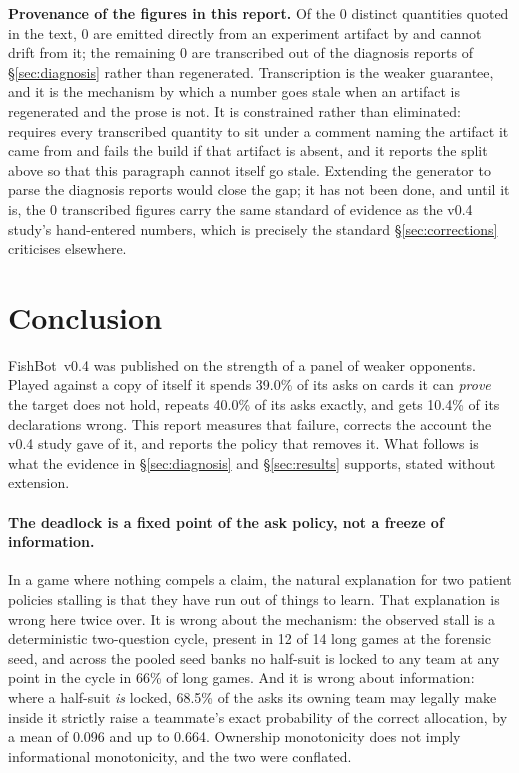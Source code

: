 \documentclass[11pt]{article}
\theoremstyle{definition}
\DeclareRobustCommand{\vfour}{\texorpdfstring{\mbox{FishBot v0.4}}{FishBot v0.4}}
\providecommand{\numDeadAsk}{39.0}
\providecommand{\numRepeatAsk}{40.0}
\providecommand{\numDeclWrong}{10.4}
\providecommand{\numLongGames}{14}
\providecommand{\numPureCycle}{12}
\providecommand{\numNoLockPct}{66}
\providecommand{\numCertRate}{68.5}
\providecommand{\numCertMean}{0.096}
\providecommand{\numCertMax}{0.664}
\providecommand{\numProvUsed}{0}
\providecommand{\numProvGenerated}{0}
\providecommand{\numProvTranscribed}{0}
\begin{document}
\textbf{Provenance of the figures in this report.} Of the \numProvUsed{}
distinct quantities quoted in the text, \numProvGenerated{} are emitted directly
from an experiment artifact by  and cannot
drift from it; the remaining \numProvTranscribed{} are transcribed out of the
diagnosis reports of \S\ref{sec:diagnosis} rather than regenerated. Transcription
is the weaker guarantee, and it is the mechanism by which a number goes stale
when an artifact is regenerated and the prose is not. It is constrained rather
than eliminated:  requires every transcribed
quantity to sit under a comment naming the artifact it came from and fails the
build if that artifact is absent, and it reports the split above so that this
paragraph cannot itself go stale. Extending the generator to parse the diagnosis
reports would close the gap; it has not been done, and until it is, the
\numProvTranscribed{} transcribed figures carry the same standard of evidence as
the v0.4 study's hand-entered numbers, which is precisely the standard
\S\ref{sec:corrections} criticises elsewhere.
\section{Conclusion}
\label{sec:conclusion}

\vfour{} was published on the strength of a panel of weaker opponents. Played
against a copy of itself it spends \numDeadAsk\% of its asks on cards it can
\emph{prove} the target does not hold, repeats \numRepeatAsk\% of its asks
exactly, and gets \numDeclWrong\% of its declarations wrong. This report
measures that failure, corrects the account the v0.4 study gave of it, and
reports the policy that removes it. What follows is what the evidence in
\S\ref{sec:diagnosis} and \S\ref{sec:results} supports, stated without
extension.

\paragraph{The deadlock is a fixed point of the ask policy, not a freeze of
information.} In a game where nothing compels a claim, the natural explanation
for two patient policies stalling is that they have run out of things to learn.
That explanation is wrong here twice over. It is wrong about the mechanism: the
observed stall is a deterministic two-question cycle, present in \numPureCycle{}
of \numLongGames{} long games at the forensic seed, and across the pooled seed
banks no half-suit is locked to any team at any point in the cycle in
\numNoLockPct\% of long games. And it is wrong about
information: where a half-suit \emph{is} locked, \numCertRate\% of the asks its
owning team may legally make inside it strictly raise a teammate's exact
probability of the correct allocation, by a mean of \numCertMean{} and up to
\numCertMax{}. Ownership monotonicity does not imply informational monotonicity,
and the two were conflated.
\end{document}
